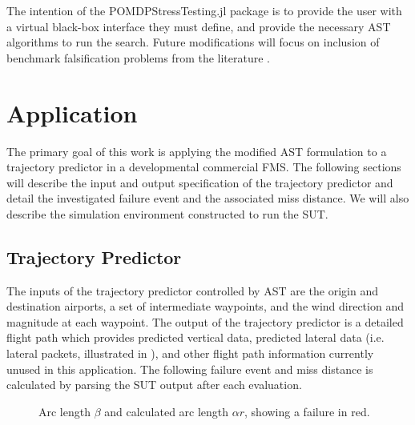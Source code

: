 The intention of the POMDPStressTesting.jl package is to provide the user with a virtual black-box interface they must define, and provide the necessary AST algorithms to run the search. Future modifications will focus on inclusion of benchmark falsification problems from the literature  \cite{arch_comp}.



\section{Application}
\label{sec:ast_application}

The primary goal of this work is applying the modified AST formulation to a trajectory predictor in a developmental commercial FMS.
The following sections will describe the input and output specification of the trajectory predictor and detail the investigated failure event and the associated miss distance.
We will also describe the simulation environment constructed to run the SUT.




\subsection{Trajectory Predictor}
The inputs of the trajectory predictor controlled by AST are the origin and destination airports, a set of intermediate waypoints, and the wind direction and magnitude at each waypoint.
The output of the trajectory predictor is a detailed flight path which provides predicted vertical data, predicted lateral data (i.e. lateral packets, illustrated in ), and other flight path information currently unused in this application.
The following failure event and miss distance is calculated by parsing the SUT output after each evaluation.




\begin{figure}[!hb]
\centering
\resizebox{0.6\columnwidth}{!}{}
\caption{Arc length $\beta$ and calculated arc length $\alpha r$, showing a failure in red.}
\label{fig:arc_length}
\end{figure}

